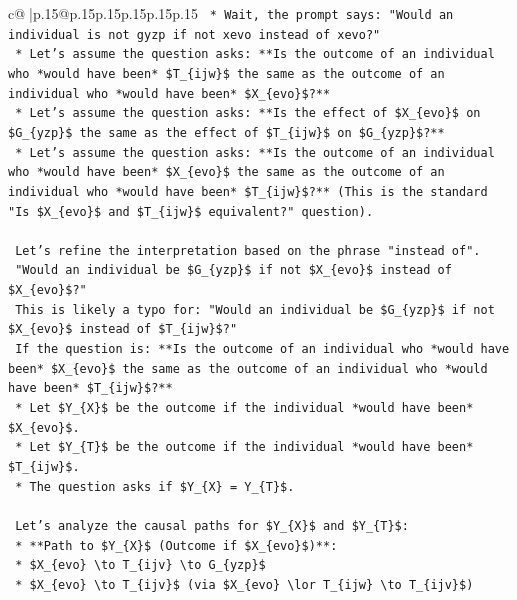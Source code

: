 \documentclass{article}
\begin{document}
{\begin{supertabular}{c@{$\;$}|p{.15\linewidth}@{}p{.15\linewidth}p{.15\linewidth}p{.15\linewidth}p{.15\linewidth}p{.15\linewidth}}
{{{\texttt{        *   Wait, the prompt says: "Would an individual is not gyzp if not xevo instead of xevo?"} \\
\texttt{        *   Let's assume the question asks: **Is the outcome of an individual who *would have been* \$T\_\{ijw\}\$ the same as the outcome of an individual who *would have been* \$X\_\{evo\}\$?**} \\
\texttt{        *   Let's assume the question asks: **Is the effect of \$X\_\{evo\}\$ on \$G\_\{yzp\}\$ the same as the effect of \$T\_\{ijw\}\$ on \$G\_\{yzp\}\$?**} \\
\texttt{        *   Let's assume the question asks: **Is the outcome of an individual who *would have been* \$X\_\{evo\}\$ the same as the outcome of an individual who *would have been* \$T\_\{ijw\}\$?** (This is the standard "Is \$X\_\{evo\}\$ and \$T\_\{ijw\}\$ equivalent?" question).} \\
\\ 
\texttt{    Let's refine the interpretation based on the phrase "instead of".} \\
\texttt{    "Would an individual be \$G\_\{yzp\}\$ if not \$X\_\{evo\}\$ instead of \$X\_\{evo\}\$?"} \\
\texttt{    This is likely a typo for: "Would an individual be \$G\_\{yzp\}\$ if not \$X\_\{evo\}\$ instead of \$T\_\{ijw\}\$?"} \\
\texttt{    If the question is: **Is the outcome of an individual who *would have been* \$X\_\{evo\}\$ the same as the outcome of an individual who *would have been* \$T\_\{ijw\}\$?**} \\
\texttt{    *   Let \$Y\_\{X\}\$ be the outcome if the individual *would have been* \$X\_\{evo\}\$.} \\
\texttt{    *   Let \$Y\_\{T\}\$ be the outcome if the individual *would have been* \$T\_\{ijw\}\$.} \\
\texttt{    *   The question asks if \$Y\_\{X\} = Y\_\{T\}\$.} \\
\\ 
\texttt{    Let's analyze the causal paths for \$Y\_\{X\}\$ and \$Y\_\{T\}\$:} \\
\texttt{    *   **Path to \$Y\_\{X\}\$ (Outcome if \$X\_\{evo\}\$)**:} \\
\texttt{        *   \$X\_\{evo\} \textbackslash{}to T\_\{ijv\} \textbackslash{}to G\_\{yzp\}\$} \\
\texttt{        *   \$X\_\{evo\} \textbackslash{}to T\_\{ijv\}\$ (via \$X\_\{evo\} \textbackslash{}lor T\_\{ijw\} \textbackslash{}to T\_\{ijv\}\$)} \\
}}}
\end{supertabular}}
\end{document}
